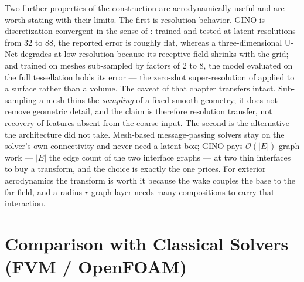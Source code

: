 Two further properties of the construction are aerodynamically useful and are worth stating
with their limits. The first is resolution behavior. GINO is discretization-convergent in the
sense of \cite{li2023geometry}: trained and tested at latent resolutions from $32$ to $88$, the
reported error is roughly flat, whereas a three-dimensional U-Net degrades at low resolution
because its receptive field shrinks with the grid; and trained on meshes sub-sampled by factors
of $2$ to $8$, the model evaluated on the full tessellation holds its error --- the zero-shot
super-resolution of  applied to a
surface rather than a volume. The caveat of that chapter transfers intact. Sub-sampling a mesh
thins the \emph{sampling} of a fixed smooth geometry; it does not remove geometric detail, and
the claim is therefore resolution transfer, not recovery of features absent from the coarse
input.
The second is the alternative the
architecture did not take. Mesh-based message-passing solvers
\cite{brandstetter2022message} stay on the solver's own connectivity and never need a latent
box; GINO pays $\mathcal{O}(|E|)$ graph work --- $|E|$ the edge count of the two interface graphs
--- at two thin interfaces to buy a transform, and the
choice is exactly the one  prices.
For exterior aerodynamics the transform is worth it because the wake couples the base to the
far field, and a radius-$r$ graph layer needs many compositions to carry that interaction.

\section{Comparison with Classical Solvers (FVM / OpenFOAM)}
\label{sec:ch32-comparison}

